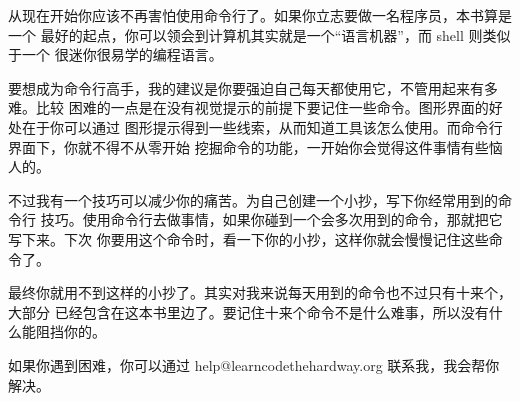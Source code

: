 从现在开始你应该不再害怕使用命令行了。如果你立志要做一名程序员，本书算是一个
最好的起点，你可以领会到计算机其实就是一个“语言机器”，而 shell 则类似于一个
很迷你很易学的编程语言。

要想成为命令行高手，我的建议是你要强迫自己每天都使用它，不管用起来有多难。比较
困难的一点是在没有视觉提示的前提下要记住一些命令。图形界面的好处在于你可以通过
图形提示得到一些线索，从而知道工具该怎么使用。而命令行界面下，你就不得不从零开始
挖掘命令的功能，一开始你会觉得这件事情有些恼人的。

不过我有一个技巧可以减少你的痛苦。为自己创建一个小抄，写下你经常用到的命令行
技巧。使用命令行去做事情，如果你碰到一个会多次用到的命令，那就把它写下来。下次
你要用这个命令时，看一下你的小抄，这样你就会慢慢记住这些命令了。

最终你就用不到这样的小抄了。其实对我来说每天用到的命令也不过只有十来个，大部分
已经包含在这本书里边了。要记住十来个命令不是什么难事，所以没有什么能阻挡你的。

如果你遇到困难，你可以通过 help@learncodethehardway.org 联系我，我会帮你解决。
